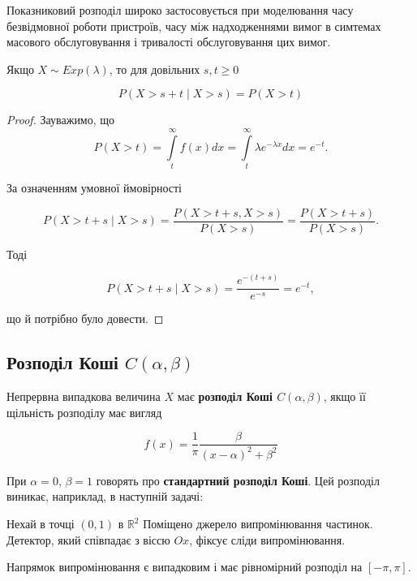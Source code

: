 Показниковий розподіл широко застосовується при моделювання часу безвідмовної роботи пристроїв,
часу між надходженнями вимог в симтемах масового обслуговування і тривалості обслуговування цих
вимог.

\begin{claim}
    Якщо $X \sim Exp(\lambda)$, то для довільних $s, t \geqslant 0$

    \begin{equation}
        P(X > s + t \mid X > s) = P(X > t)
    \end{equation}
\end{claim}
\begin{proof}
    Зауважимо, що
    $$P(X > t)
    = \int\limits_{t}^{\infty} f(x) dx
    = \int\limits_{t}^{\infty} \lambda e^{-\lambda x} dx
    = e^{-t}.$$

    За означенням умовної ймовірності

    $$P(X > t + s \mid X > s)
    = \frac{P(X > t + s, X > s)}{P(X > s)}
    = \frac{P(X > t + s)}{P(X > s)}.$$
    
    Тоді
    
    $$P(X > t + s \mid X > s)
    = \frac{e^{-(t+s)}}{e^{-s}}
    = e^{-t},$$
    
    що й потрібно було довести.
\end{proof}

\beautifulImage

\subsection[Розподіл Коші]{Розподіл Коші $C(\alpha, \beta)$}

Непрервна випадкова величина $X$ має \textbf{розподіл Коші $C(\alpha, \beta)$},
якщо її щільність розподілу має вигляд

\begin{equation}
    f(x) = \frac{1}{\pi} \frac{\beta}{(x-\alpha)^2 + \beta^2}
\end{equation}


При $\alpha = 0$, $\beta = 1$ говорять про \textbf{стандартний розподіл Коші}.
Цей розподіл виникає, наприклад, в наступній задачі:

\begin{example}
    Нехай в точці $(0,1)$ в $\mathbb{R}^2$ Поміщено джерело випромінювання
    частинок. Детектор, який співпадає з віссю $Ox$,
    фіксує сліди випромінювання.
\end{example}

Напрямок випромінювання є випадковим і має рівномірний розподіл на $[-\pi, \pi]$.

